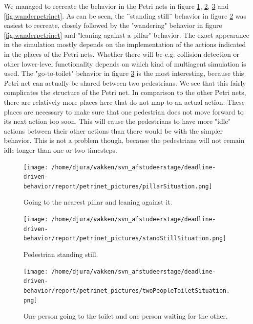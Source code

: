 \documentclass[11pt]{book}
\begin{document}
We managed to recreate the behavior in the Petri nets in figure \ref{fig:pillarpetrinet}, \ref{fig:standstillpetrinet}, \ref{fig:gototoiletpetrinet} and \ref{fig:wanderpetrinet}. As can be seen, the ¨standing still¨ behavior in figure \ref{fig:standstillpetrinet} was easiest to recreate, closely followed by the "wandering" behavior in figure \ref{fig:wanderpetrinet} and "leaning against a pillar" behavior. The exact appearance in the simulation mostly depends on the implementation of the actions indicated in the places of the Petri nets. Whether there will be e.g. collision detection or other lower-level functionality depends on which kind of multiagent simulation is used. The "go-to-toilet" behavior in figure \ref{fig:gototoiletpetrinet} is the most interesting, because this Petri net can actually be shared between two pedestrians. We see that this fairly complicates the structure of the Petri net. In comparison to the other Petri nets, there are relatively more places here that do not map to an actual action. These places are necessary to make sure that one pedestrian does not move forward to its next action too soon. This will cause the pedestrians to have more "idle" actions between their other actions than there would be with the simpler behavior. This is not a problem though, because the pedestrians will not remain idle longer than one or two timesteps.


\begin{figure}
\centering            
\texttt{[image: /home/djura/vakken/svn\_afstudeerstage/deadline-driven-behavior/report/petrinet\_pictures/pillarSituation.png]}
\caption{Going to the nearest pillar and leaning against it.}
\label{fig:pillarpetrinet}
\end{figure}

\begin{figure}
\centering            
\texttt{[image: /home/djura/vakken/svn\_afstudeerstage/deadline-driven-behavior/report/petrinet\_pictures/standStillSituation.png]}
\caption{Pedestrian standing still.}
\label{fig:standstillpetrinet}
\end{figure}

\begin{figure}
\centering            
\texttt{[image: /home/djura/vakken/svn\_afstudeerstage/deadline-driven-behavior/report/petrinet\_pictures/twoPeopleToiletSituation.png]}
\caption{One person going to the toilet and one person waiting for the other.}
\label{fig:gototoiletpetrinet}
\end{figure}
\end{document}
